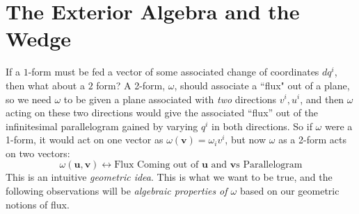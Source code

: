 	
	
	
	\section{The Exterior Algebra and the Wedge} %
	\label{sec:the_exterior_algebra_and_the_wedge}
	
	If a $1$-form must be fed a vector of some associated change of coordinates $dq^i$, then what about a $2$ form? A 2-form, $\omega$, should associate a ``flux" out of a plane, so we need $\omega$ to be given a plane associated with \emph{two} directions $v^i, u^i$, and then $\omega$ acting on these two directions would give the associated ``flux'' out of the infinitesimal parallelogram gained by varying $q^i$ in both directions. So if $\omega$ were a 1-form, it would act on one vector as $\omega(\mathbf v)=\omega_i v^i$, but now $\omega$ as a 2-form acts on two vectors:
	\begin{equation*}
		\omega(\mathbf u, \mathbf v) \longleftrightarrow \text{Flux Coming out of $\mathbf u$ and $\mathbf v$s Parallelogram}
	\end{equation*}
	This is an intuitive \emph{geometric idea}. This is what we want to be true, and the following observations will be \emph{algebraic properties of $\omega$} based on our geometric notions of flux.\\

